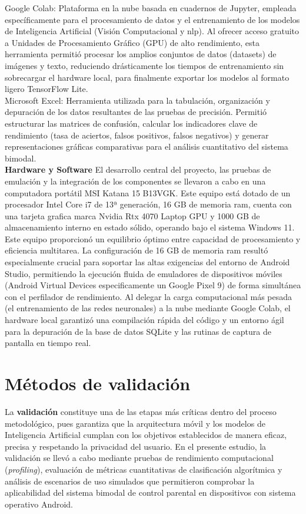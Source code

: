 Google Colab: Plataforma en la nube basada en cuadernos de Jupyter, empleada específicamente para el procesamiento de datos y el entrenamiento de los modelos de Inteligencia Artificial (Visión Computacional y \gls{nlp}). Al ofrecer acceso gratuito a Unidades de Procesamiento Gráfico (GPU) de alto rendimiento, esta herramienta permitió procesar los amplios conjuntos de datos (datasets) de imágenes y texto, reduciendo drásticamente los tiempos de entrenamiento sin sobrecargar el hardware local, para finalmente exportar los modelos al formato ligero TensorFlow Lite.\\

Microsoft Excel: Herramienta utilizada para la tabulación, organización y depuración de los datos resultantes de las pruebas de precisión. Permitió estructurar las matrices de confusión, calcular los indicadores clave de rendimiento (tasa de aciertos, falsos positivos, falsos negativos) y generar representaciones gráficas comparativas para el análisis cuantitativo del sistema bimodal.\\

\textbf{Hardware y Software}
El desarrollo central del proyecto, las pruebas de emulación y la integración de los componentes se llevaron a cabo en una computadora portátil MSI Katana 15 B13VGK. Este equipo está dotado de un procesador Intel Core i7 de 13ª generación, 16 GB de memoria \gls{ram}, cuenta con una tarjeta grafica marca Nvidia  Rtx 4070 Laptop GPU   y 1000 GB de almacenamiento interno en estado sólido, operando bajo el sistema Windows 11.\\

Este equipo proporcionó un equilibrio óptimo entre capacidad de procesamiento y eficiencia multitarea. La configuración de 16 GB de memoria \gls{ram} resultó especialmente crucial para soportar las altas exigencias del entorno de Android Studio, permitiendo la ejecución fluida de emuladores de dispositivos móviles (Android Virtual Devices especificamente un Google Pixel 9) de forma simultánea con el perfilador de rendimiento. Al delegar la carga computacional más pesada (el entrenamiento de las redes neuronales) a la nube mediante Google Colab, el hardware local garantizó una compilación rápida del código y un entorno ágil para la depuración de la base de datos SQLite y las rutinas de captura de pantalla en tiempo real.

\section{Métodos de validación}
La \textbf{validación} constituye una de las etapas más críticas dentro del proceso metodológico, pues garantiza que la arquitectura móvil y los modelos de Inteligencia Artificial cumplan con los objetivos establecidos de manera eficaz, precisa y respetando la privacidad del usuario. En el presente estudio, la validación se llevó a cabo mediante pruebas de rendimiento computacional (\textit{profiling}), evaluación de métricas cuantitativas de clasificación algorítmica y análisis de escenarios de uso simulados que permitieron comprobar la aplicabilidad del sistema bimodal de control parental en dispositivos con sistema operativo Android.

